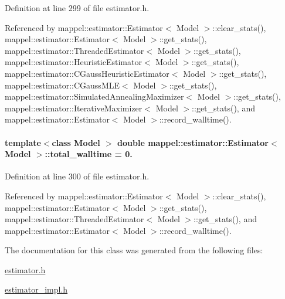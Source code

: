 Definition at line 299 of file estimator.\+h.



Referenced by mappel\+::estimator\+::\+Estimator$<$ Model $>$\+::clear\+\_\+stats(), mappel\+::estimator\+::\+Estimator$<$ Model $>$\+::get\+\_\+stats(), mappel\+::estimator\+::\+Threaded\+Estimator$<$ Model $>$\+::get\+\_\+stats(), mappel\+::estimator\+::\+Heuristic\+Estimator$<$ Model $>$\+::get\+\_\+stats(), mappel\+::estimator\+::\+C\+Gauss\+Heuristic\+Estimator$<$ Model $>$\+::get\+\_\+stats(), mappel\+::estimator\+::\+C\+Gauss\+M\+L\+E$<$ Model $>$\+::get\+\_\+stats(), mappel\+::estimator\+::\+Simulated\+Annealing\+Maximizer$<$ Model $>$\+::get\+\_\+stats(), mappel\+::estimator\+::\+Iterative\+Maximizer$<$ Model $>$\+::get\+\_\+stats(), and mappel\+::estimator\+::\+Estimator$<$ Model $>$\+::record\+\_\+walltime().

\paragraph[{\texorpdfstring{total\+\_\+walltime}{total_walltime}}]{\setlength{\rightskip}{0pt plus 5cm}template$<$class Model $>$ double {\bf mappel\+::estimator\+::\+Estimator}$<$ Model $>$\+::total\+\_\+walltime = 0.\hspace{0.3cm}{\ttfamily [protected]}}\hypertarget{classmappel_1_1estimator_1_1Estimator_a98ad459e850aeb2c42c10fd06c3b9fbc}{}\label{classmappel_1_1estimator_1_1Estimator_a98ad459e850aeb2c42c10fd06c3b9fbc}


Definition at line 300 of file estimator.\+h.



Referenced by mappel\+::estimator\+::\+Estimator$<$ Model $>$\+::clear\+\_\+stats(), mappel\+::estimator\+::\+Estimator$<$ Model $>$\+::get\+\_\+stats(), mappel\+::estimator\+::\+Threaded\+Estimator$<$ Model $>$\+::get\+\_\+stats(), and mappel\+::estimator\+::\+Estimator$<$ Model $>$\+::record\+\_\+walltime().



The documentation for this class was generated from the following files\+:\begin{DoxyCompactItemize}
\item 
\hyperlink{estimator_8h}{estimator.\+h}\item 
\hyperlink{estimator__impl_8h}{estimator\+\_\+impl.\+h}\end{DoxyCompactItemize}
